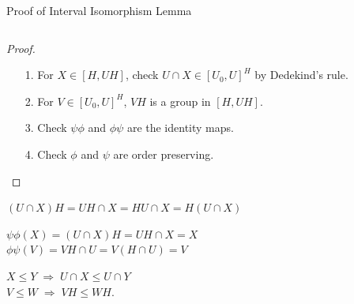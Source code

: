\begin{frame}[fragile,label=ProofOfIntervalIsomorphism,shrink=5]{Proof of Interval Isomorphism Lemma}
\begin{columns}
  \end{columns}
\vskip5mm
      \begin{proof}
        \begin{itemize}
        \item[1.] For $X\in [H, UH]$,
          check $U\cap X \in [U_0, U]^H$ by Dedekind's rule.\vskip6pt
        \item[2.] For $V\in [U_0, U]^H$, $VH$ is a group in $[H, UH]$.\vskip6pt
        \item[3.]  Check $\psi \phi$ and $\phi \psi$ are the identity maps. \vskip6pt
        \item[4.] Check $\phi$ and $\psi$ are order preserving.
        \end{itemize}
      \end{proof}

\end{frame}

\begin{frame}[fragile,label=ComputationsForProofOfIntervalIsomorphism,shrink=5]{}
 $(U\cap X) H = UH \cap X= HU \cap X = H(U \cap X)$
\end{frame}
\begin{frame}[fragile,label=ComputationsForProofOfIntervalIsomorphism,shrink=5]{}
  $\psi \phi (X) = (U\cap X)H =UH \cap X = X$\\[4pt]
  $\phi \psi(V)= VH \cap U =V(H\cap U)= V$
\end{frame}
\begin{frame}[fragile,label=ComputationsForProofOfIntervalIsomorphism,shrink=5]{}
$X\leq Y \; \Rightarrow \; U\cap X \leq U\cap Y$\\[4pt]
  $V\leq W \; \Rightarrow \; VH \leq WH$.
\end{frame}


